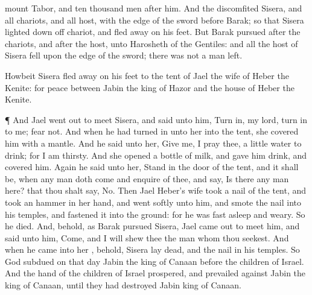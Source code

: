 {mount
Tabor, and
ten
thousand
men
after him.
And the
{}
discomfited
Sisera, and all
{}
chariots, and all
{}
host, with the
edge of the
sword
before
Barak; so that
Sisera lighted
down off
{}
chariot, and fled
away on his
feet.
But
Barak
pursued
after the
chariots, and after the
host, unto
Harosheth of the
Gentiles: and all the
host of
Sisera
fell upon the
edge of the
sword;
{} there was not a
man
left.
\par }{\PP {}Howbeit
Sisera fled
away on his
feet to the
tent of
Jael the
wife of
Heber the
Kenite: for
{}
peace between
Jabin the
king of
Hazor and the
house of
Heber the
Kenite.
\par }{\PP {}¶ And
Jael went
out to
meet
Sisera, and
said unto him, Turn
in, my
lord, turn
in to me;
fear not. And when he had turned
in unto her into the
tent, she
covered him with a
mantle.
And he
said unto her, Give me, I pray thee, a
little
water to
drink; for I am
thirsty. And she
opened a
bottle of
milk, and gave him
drink, and
covered him.
Again he
said unto her, Stand
in the
door of the
tent, and it shall be, when any
man doth
come and
enquire of thee, and
say, Is
there any
man
here? that thou shalt
say, No.
Then
Jael
Heber’s
wife
took a
nail of the
tent, and
took an
hammer in her
hand, and
went
softly unto him, and
smote the
nail into his
temples, and
fastened it into the
ground: for he was fast
asleep and
weary. So he
died.
And, behold, as
Barak
pursued
Sisera,
Jael came
out to
meet him, and
said unto him,
Come, and I will
shew thee the
man whom thou
seekest. And when he
came into her
{}, behold,
Sisera
lay
dead, and the
nail
{} in his
temples.
So
God
subdued on that
day
Jabin the
king of
Canaan
before the
children of
Israel.
And the
hand of the
children of
Israel
prospered, and
prevailed against
Jabin the
king of
Canaan, until they had
destroyed
Jabin
king of
Canaan.

}
